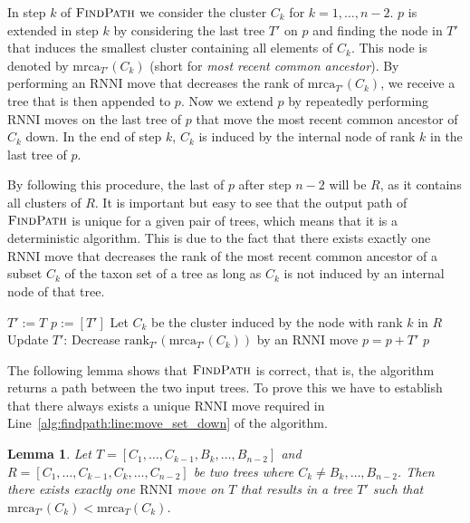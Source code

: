 \documentclass{amsart}
\newcommand{\mrca}{\mathrm{mrca}}
\newcommand{\rank}{\mathrm{rank}}
\newcommand{\rnni}{\mathrm{RNNI}}
\newcommand{\findpath}{\textsc{FindPath}}
\newtheorem{lemma}[definition]{Lemma}
\begin{document}
In step $k$ of $\findpath$ we consider the cluster $C_k$ for $k = 1, \ldots, n-2$.
$p$ is extended in step $k$ by considering the last tree $T'$ on $p$ and finding the node in $T'$ that induces the smallest cluster containing all elements of $C_k$.
This node is denoted by $\mrca_{T'}(C_k)$ (short for \emph{most recent common ancestor}).
By performing an $\rnni$ move that decreases the rank of $\mrca_{T'}(C_k)$, we receive a tree that is then appended to $p$.
Now we extend $p$ by repeatedly performing $\rnni$ moves on the last tree of $p$ that move the most recent common ancestor of $C_k$ down.
In the end of step $k$, $C_k$ is induced by the internal node of rank $k$ in the last tree of $p$.

By following this procedure, the last of $p$ after step $n-2$ will be $R$, as it contains all clusters of $R$.
It is important but easy to see that the output path of $\findpath$ is unique for a given pair of trees, which means that it is a deterministic algorithm.
This is due to the fact that there exists exactly one $\rnni$ move that decreases the rank of the most recent common ancestor of a subset $C_k$ of the taxon set of a tree as long as $C_k$ is not induced by an internal node of that tree.

\begin{algorithm}[H]
\caption{$\findpath$($T,R$)}
\label{alg:find_path}
\begin{algorithmic}[1]
\STATE $T' := T$
\STATE $p := [T']$
\STATE Let $C_k$ be the cluster induced by the node with rank $k$ in $R$ \label{alg:find_path:line:cluster}
\WHILE {$\rank_{T'}(\mrca_{T'}(C_k))>k$}
\STATE Update $T'$: Decrease $\rank_{T'}(\mrca_{T'}(C_k))$ by an $\rnni$ move \label{alg:findpath:line:move_set_down}
\STATE $p = p+T'$
\ENDWHILE
\ENDFOR
\RETURN $p$
\end{algorithmic}
\end{algorithm}

The following lemma shows that $\findpath$ is correct, that is, the algorithm returns a path between the two input trees.
To prove this we have to establish that there always exists a unique $\rnni$ move required in Line~\ref{alg:findpath:line:move_set_down} of the algorithm.

\begin{lemma}
Let $T = [C_1, \ldots, C_{k-1}, B_{k}, \ldots, B_{n-2}]$ and $R = [C_1, \ldots, C_{k-1}, C_k, \ldots, C_{n-2}]$ be two trees where $C_k \neq B_k, \ldots, B_{n-2}$.
Then there exists exactly one $\rnni$ move on $T$ that results in a tree $T'$ such that $\mrca_{T'}(C_k) < \mrca_{T}(C_k)$.
\label{lemma:mrca_move}
\end{lemma}
\end{document}
